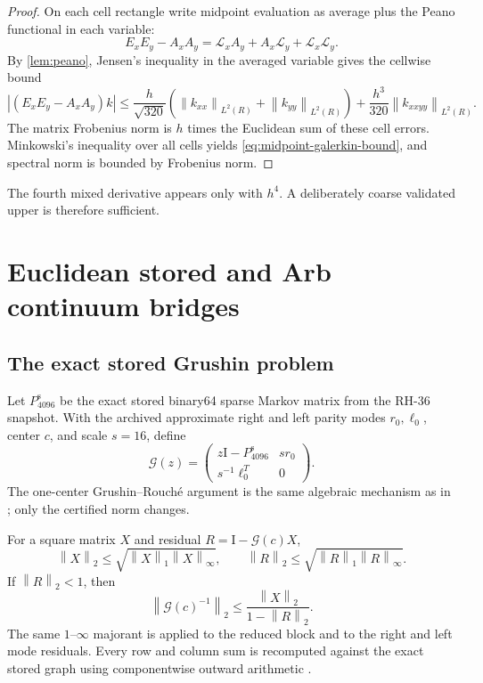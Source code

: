 \documentclass[11pt]{article}
\theoremstyle{definition}
\theoremstyle{remark}
\newcommand{\Id}{\mathrm I}
\newcommand{\norm}[1]{\left\lVert #1\right\rVert}
\begin{document}
\begin{proof}
On each cell rectangle write midpoint evaluation as average plus the Peano
functional in each variable:
\[
 E_xE_y-A_xA_y
 =\mathcal L_xA_y+A_x\mathcal L_y+\mathcal L_x\mathcal L_y.
\]
By \cref{lem:peano}, Jensen's inequality in the averaged variable gives the
cellwise bound
\[
 |(E_xE_y-A_xA_y)k|
 \le
 \frac h{\sqrt{320}}
 \left(\norm{k_{xx}}_{L^2(R)}+\norm{k_{yy}}_{L^2(R)}\right)
 +\frac{h^3}{320}\norm{k_{xxyy}}_{L^2(R)}.
\]
The matrix Frobenius norm is $h$ times the Euclidean sum of these cell
errors.  Minkowski's inequality over all cells yields
\eqref{eq:midpoint-galerkin-bound}, and spectral norm is bounded by
Frobenius norm.
\end{proof}

The fourth mixed derivative appears only with $h^4$.  A deliberately coarse
validated upper is therefore sufficient.

\section{Euclidean stored and Arb continuum bridges}
\label{sec:stored}

\subsection{The exact stored Grushin problem}

Let $P_{4096}^{\mathrm s}$ be the exact stored binary64 sparse Markov matrix
from the RH-36 snapshot.  With the archived approximate right and left
parity modes $r_0,\ell_0$, center $c$, and scale $s=16$, define
\[
 \mathcal G(z)=
 \begin{pmatrix}
 z\Id-P_{4096}^{\mathrm s}&sr_0\\
 s^{-1}\ell_0^T&0
 \end{pmatrix}.
\]
The one-center Grushin--Rouch\'e argument is the same algebraic mechanism as
in \citet{WangContinuumContour2026}; only the certified norm changes.

For a square matrix $X$ and residual
$R=\Id-\mathcal G(c)X$,
\[
 \norm X_2\le\sqrt{\norm X_1\norm X_\infty},\qquad
 \norm R_2\le\sqrt{\norm R_1\norm R_\infty}.
\]
If $\norm R_2<1$, then
\[
 \norm{\mathcal G(c)^{-1}}_2
 \le\frac{\norm X_2}{1-\norm R_2}.
\]
The same $1$--$\infty$ majorant is applied to the reduced block and to the
right and left mode residuals.  Every row and column sum is recomputed
against the exact stored graph using componentwise outward arithmetic
\citep{Rump2010,WangOutward2026}.
\end{document}
